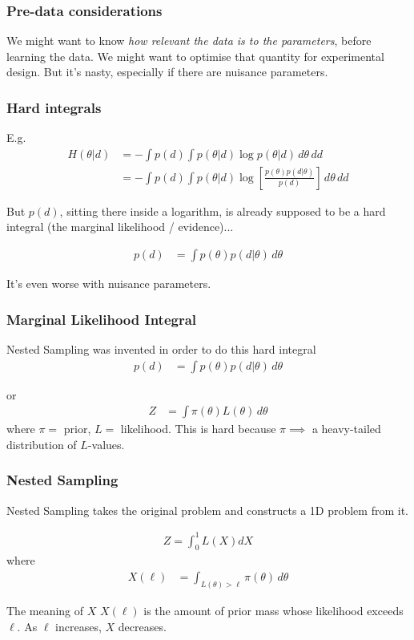 \documentclass{beamer}
\begin{document}
\begin{frame}
\frametitle{Pre-data considerations}

We might want to know {\em how relevant the data is to the parameters},
before learning the data. We might want to optimise that quantity for
experimental design. But it's nasty, especially if there are nuisance
parameters.
\end{frame}


\begin{frame}
\frametitle{Hard integrals}

E.g.
\begin{align}
H(\theta|d) &= -\int p(d) \int p(\theta|d) \log p(\theta|d) \, d\theta \, dd \\
            &= -\int p(d) \int p(\theta|d)
                    \log\left[\frac{p(\theta)p(d|\theta)}{p(d)}\right] \, d\theta \, dd
\end{align}

But $p(d)$, sitting there inside a logarithm, is already supposed to be
a hard integral (the marginal likelihood / evidence)...

\begin{align}
p(d) &= \int p(\theta) p(d|\theta) \, d\theta
\end{align}

It's even worse with nuisance parameters.

\end{frame}



\begin{frame}
\frametitle{Marginal Likelihood Integral}
Nested Sampling was invented in order to do this hard integral
\begin{align}
p(d) &= \int p(\theta) p(d|\theta) \, d\theta
\end{align}

or
\begin{align}
Z &= \int \pi(\theta) L(\theta) \, d\theta
\end{align}
where $\pi=$ prior, $L=$ likelihood.
This is hard because $\pi \implies$ a heavy-tailed
distribution of $L$-values.

\end{frame}


\begin{frame}
\frametitle{Nested Sampling}
Nested Sampling takes the original problem and constructs
a 1D problem from it.

\begin{align}
Z = \int_0^1 L(X) dX
\end{align}
where
\begin{align}
X(\ell) &= \int_{L(\theta) > \ell} \pi(\theta) \, d\theta
\end{align}

\begin{block}{The meaning of $X$}
$X(\ell)$ is the amount of prior mass whose likelihood exceeds
$\ell$. As $\ell$ increases, $X$ decreases.
\end{block}

\end{frame}
\end{document}
